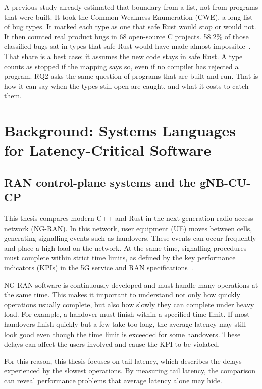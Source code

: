 \documentclass[english,oneside,a4paper,censored,csm,software-track-2020]{HYthesisML}
\begin{document}
A previous study already estimated that boundary from a list, not from
programs that were built.
It took the Common Weakness Enumeration (CWE), a long list of bug
types.
It marked each type as one that safe Rust would stop or would not.
It then counted real product bugs in 68 open-source C projects.
58.2\% of those classified bugs sat in types that safe Rust would have
made almost impossible~\cite{meneely2025justuserust}.
That share is a best case: it assumes the new code stays in safe Rust.
A type counts as stopped if the mapping says so, even if no compiler
has rejected a program.
RQ2 asks the same question of programs that are built and run.
That is how it can say when the types still open are caught, and what
it costs to catch them.

\chapter{Background: Systems Languages for Latency-Critical Software\label{chapter:background}}

\section{RAN control-plane systems and the gNB-CU-CP}\label{sec:ranarch}
This thesis compares modern C++ and Rust in the next-generation radio access network (NG-RAN).
In this network, user equipment (UE) moves between cells, generating signalling events such as
handovers. These events can occur frequently and place a high load on the network. At the same
time, signalling procedures must complete within strict time limits, as defined by the key
performance indicators (KPIs) in the 5G service and RAN specifications~\cite{3gpp38913,3gpp22261}.

NG-RAN software is continuously developed and must handle many operations at the same time.
This makes it important to understand not only how quickly operations usually complete, but also
how slowly they can complete under heavy load. For example, a handover must finish within a
specified time limit. If most handovers finish quickly but a few take too long, the average
latency may still look good even though the time limit is exceeded for some handovers. These
delays can affect the users involved and cause the KPI to be violated.

For this reason, this thesis focuses on tail latency, which describes the delays experienced by
the slowest operations. By measuring tail latency, the comparison can reveal performance problems
that average latency alone may hide.
\end{document}
